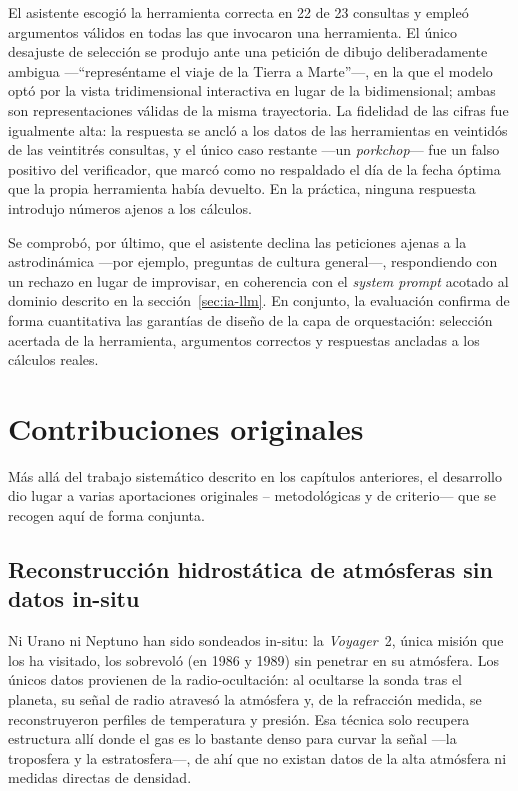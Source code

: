 El asistente escogió la herramienta correcta en 22 de 23 consultas y empleó argumentos válidos en todas las que invocaron una herramienta. El único desajuste de selección se produjo ante una petición de dibujo deliberadamente ambigua ---``represéntame el viaje de la Tierra a Marte''---, en la que el modelo optó por la vista tridimensional interactiva en lugar de la bidimensional; ambas son representaciones válidas de la misma trayectoria. La fidelidad de las cifras fue igualmente alta: la respuesta se ancló a los datos de las herramientas en veintidós de las veintitrés consultas, y el único caso restante ---un \textit{porkchop}--- fue un falso positivo del verificador, que marcó como no respaldado el día de la fecha óptima que la propia herramienta había devuelto. En la práctica, ninguna respuesta introdujo números ajenos a los cálculos.

Se comprobó, por último, que el asistente declina las peticiones ajenas a la astrodinámica ---por ejemplo, preguntas de cultura general---, respondiendo con un rechazo en lugar de improvisar, en coherencia con el \textit{system prompt} acotado al dominio descrito en la sección~\ref{sec:ia-llm}. En conjunto, la evaluación confirma de forma cuantitativa las garantías de diseño de la capa de orquestación: selección acertada de la herramienta, argumentos correctos y respuestas ancladas a los cálculos reales.

\section{Contribuciones originales}
\label{sec:res-contribuciones}

Más allá del trabajo sistemático descrito en los capítulos anteriores, el desarrollo dio lugar a varias aportaciones originales -- metodológicas y de criterio--- que se recogen aquí de forma conjunta.

\subsection{Reconstrucción hidrostática de atmósferas sin datos in-situ}

Ni Urano ni Neptuno han sido sondeados in-situ: la \textit{Voyager}~2, única misión que los ha visitado, los sobrevoló (en 1986 y 1989) sin penetrar en su atmósfera. Los únicos datos provienen de la radio-ocultación: al ocultarse la sonda tras el planeta, su señal de radio atravesó la atmósfera y, de la refracción medida, se reconstruyeron perfiles de temperatura y presión. Esa técnica solo recupera estructura allí donde el gas es lo bastante denso para curvar la señal ---la troposfera y la estratosfera---, de ahí que no existan datos de la alta atmósfera ni medidas directas de densidad.

